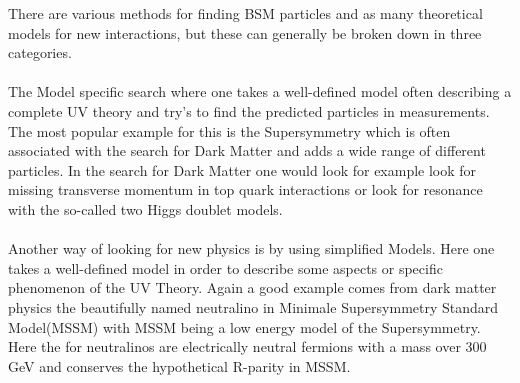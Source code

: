 \documentclass[../Bachelorarbeit.tex]{subfiles}
\begin{document}
There are various methods for finding BSM particles and as many theoretical models for new interactions, but these can generally be broken down in three categories.
\\\\
The Model specific search where one takes a well-defined model often describing a complete UV theory and try's to find the predicted particles in measurements.
The most popular example for this is the Supersymmetry which is often associated with the search for Dark Matter and adds a wide range of different particles.
In the search for Dark Matter one would look for example look for missing transverse momentum in top quark interactions or look for resonance with the so-called
two Higgs doublet models.
\\\\
Another way of looking for new physics is by using simplified Models. Here one takes a well-defined model in order to describe some aspects or specific phenomenon of the UV Theory.
Again a good example comes from dark matter physics the beautifully named neutralino in Minimale Supersymmetry Standard Model(MSSM) with MSSM being a low energy model of the Supersymmetry.
Here the for neutralinos are electrically neutral fermions with a mass over 300 GeV and conserves the hypothetical R-parity in MSSM.
\\\\
\end{document}
